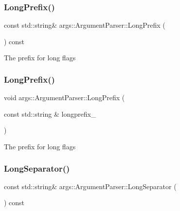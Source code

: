 \subsubsection{\texorpdfstring{Long\+Prefix()}{LongPrefix()}\hspace{0.1cm}{\footnotesize\ttfamily [1/2]}}
{\footnotesize\ttfamily const std\+::string\& args\+::\+Argument\+Parser\+::\+Long\+Prefix (\begin{DoxyParamCaption}{ }\end{DoxyParamCaption}) const\hspace{0.3cm}{\ttfamily [inline]}}

The prefix for long flags \mbox{\label{classargs_1_1_argument_parser_a6a03dcc56b439d54b85e704be5d2f9d5}} 
\subsubsection{\texorpdfstring{Long\+Prefix()}{LongPrefix()}\hspace{0.1cm}{\footnotesize\ttfamily [2/2]}}
{\footnotesize\ttfamily void args\+::\+Argument\+Parser\+::\+Long\+Prefix (\begin{DoxyParamCaption}\item[{const std\+::string \&}]{longprefix\+\_\+ }\end{DoxyParamCaption})\hspace{0.3cm}{\ttfamily [inline]}}

The prefix for long flags \mbox{\label{classargs_1_1_argument_parser_a7bb74e0a1bcac7f390f5bf5a5fef44e6}} 
\subsubsection{\texorpdfstring{Long\+Separator()}{LongSeparator()}\hspace{0.1cm}{\footnotesize\ttfamily [1/2]}}
{\footnotesize\ttfamily const std\+::string\& args\+::\+Argument\+Parser\+::\+Long\+Separator (\begin{DoxyParamCaption}{ }\end{DoxyParamCaption}) const\hspace{0.3cm}{\ttfamily [inline]}}


